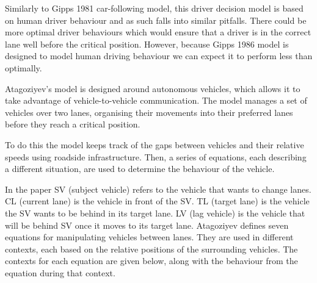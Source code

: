 Similarly to Gipps 1981 car-following model, this driver decision model is based on human driver behaviour and as such falls into similar pitfalls. There could be more optimal driver behaviours which would ensure that a driver is in the correct lane well before the critical position. However, because Gipps 1986 model is designed to model human driving behaviour we can expect it to perform less than optimally.

Atagoziyev's model is designed around autonomous vehicles, which allows it to take advantage of vehicle-to-vehicle communication. The model manages a set of vehicles over two lanes, organising their movements into their preferred lanes before they reach a critical position.

To do this the model keeps track of the gaps between vehicles and their relative speeds using roadside infrastructure. Then, a series of equations, each describing a different situation, are used to determine the behaviour of the vehicle.

In the paper SV (subject vehicle) refers to the vehicle that wants to change lanes. CL (current lane) is the vehicle in front of the SV. TL (target lane) is the vehicle the SV wants to be behind in its target lane. LV (lag vehicle) is the vehicle that will be behind SV once it moves to its target  lane. Atagoziyev defines seven equations for manipulating vehicles between lanes. They are used in different contexts, each based on the relative positions of the surrounding vehicles. The contexts for each equation are given below, along with the behaviour from the equation during that context.

